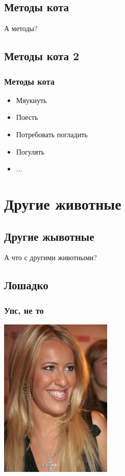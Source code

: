 \documentclass[compress,red]{beamer}
\begin{document}
\subsection{Методы кота}
\begin{frame}
  \begin{center}
    \Huge{А методы?}
  \end{center}
\end{frame}

\subsection{Методы кота 2}
\begin{frame}[fragile]
  \frametitle{Методы кота}
  \begin{itemize}
    \item Мяукнуть
    \item Поесть
    \item Потребовать погладить
    \item Погулять
    \item ...
  \end{itemize}
\end{frame}

\section{Другие животные}

\subsection{Другие жывотные}
\begin{frame}
  \begin{center}
    \Huge{А что с другими животными?}
  \end{center}
\end{frame}

\subsection{Лошадко}
\begin{frame}[fragile]
  \frametitle{Упс, не то}
  \centerline{\includegraphics[width=0.4\textwidth]{images/loshadko.jpg}}
\end{frame}
\end{document}
